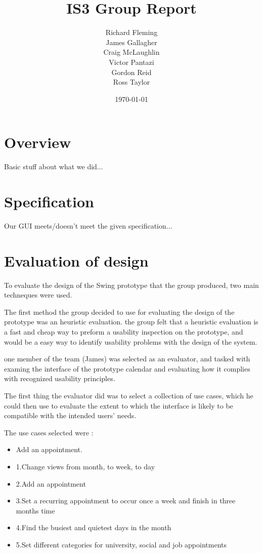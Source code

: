 \documentclass{article}
\title{IS3 Group Report}
\author{
  Richard Fleming \\
  James Gallagher \\
  Craig McLaughlin \\
  Victor Pantazi \\
  Gordon Reid \\
  Ross Taylor}
\date{\today}
\begin{document}

\maketitle


\section{Overview}

Basic stuff about what we did...

\section{Specification}

Our GUI meets/doesn't meet the given specification...

\section{Evaluation of design}

To evaluate the design of the Swing prototype that the group produced, two main techneques were used.  

The first method the group decided to use for evaluating the design of the prototype was an heuristic evaluation. 
the group felt that a heuristic evaluation is a fast and cheap way to preform a usability inspection on the prototype, and would be a easy way to identify usability problems with the design of the system. 

one member of the team (James) was selected as an evaluator, and tasked with examing the interface of the prototype calendar and evaluating how it complies with recognized usability principles. 

The first thing the evaluator did was to select a collection of use cases, which he could then use to evaluate the extent to which the interface is likely to be compatible with the intended users’ needs. 

The use cases selected were : 
\begin{itemize}
\item Add an appointment.

\item 1.Change views from month, to week, to day 
\item 2.Add an appointment 
\item 3.Set a recurring appointment to occur once a week and finish in three months time
\item 4.Find the busiest and quietest days in the month
\item 5.Set different categories for university, social and job appointments
\end{itemize}
\end{document}
